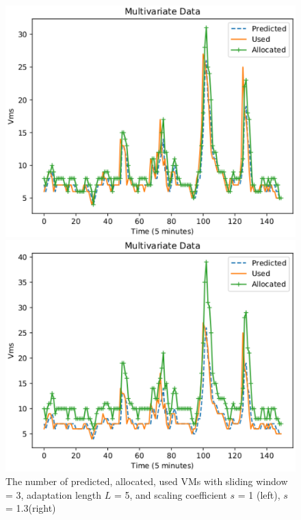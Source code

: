 \documentclass[runningheads]{llncs}
\begin{document}
\begin{figure}[!ht]
	\centering
	\begin{minipage}[t]{6cm}
		\centering
		\includegraphics[width=1\textwidth]{images/pdf/scaling/fl_bfonn_vms-s_10-L_5.eps}
	\end{minipage}
	\begin{minipage}[t]{6cm}
		\centering
		\includegraphics[width=1\textwidth]{images/pdf/scaling/fl_bfonn_vms-s_13-L_5.eps}
	\end{minipage}
	\caption{The number of predicted, allocated, used VMs with sliding window = 3, adaptation length $L$ = 5, and scaling coefficient $s$ = 1 (left), $s$ = 1.3(right)} 
	\label{fig_scaling_1013}
\end{figure}
\end{document}
